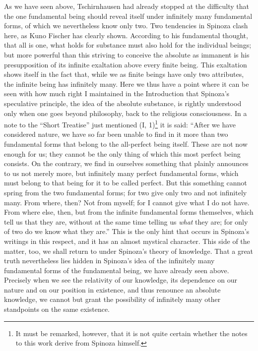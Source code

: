 \documentclass[12pt]{book}
\newcommand{\opage}[1]{\marginnote{\footnotesize\textit{[#1]}}}
\begin{document}
As we have seen above, Tschirnhausen had already stopped at the difficulty that the one
fundamental being should reveal itself under infinitely many fundamental forms, of which
we nevertheless know only two. Two tendencies in Spinoza clash here, as Kuno Fischer
has clearly shown. According to his fundamental thought, that all is one, what holds
for substance must also hold for the individual beings; but more powerful than this
striving to conceive the absolute as immanent is his presupposition of its infinite
exaltation above every finite being. This exaltation shows itself in the fact that,
while we as finite beings have only two attributes, the infinite being has infinitely
many. Here we thus have a point where it can be seen with how much right I maintained
in the Introduction that Spinoza's speculative principle, the idea of the absolute
substance, is rightly understood only when one goes beyond philosophy, back to the
religious consciousness. In a note to the ``Short Treatise'' just mentioned
\opage{81}(I, 1)\footnote{It must be remarked, however, that it is not quite certain
whether the notes to this work derive from Spinoza himself.} it is said: ``After we
have considered nature, we have so far been unable to find in it more than two
fundamental forms that belong to the all-perfect being itself. These are not now enough
for us; they cannot be the only thing of which this most perfect being consists. On the
contrary, we find in ourselves something that plainly announces to us not merely more,
but infinitely many perfect fundamental forms, which must belong to that being for it
to be called perfect. But this something cannot spring from the two fundamental forms;
for two give only two and not infinitely many. From where, then? Not from myself; for I
cannot give what I do not have. From where else, then, but from the infinite
fundamental forms themselves, which tell us that they are, without at the same time
telling us \emph{what} they are; for only of two do we know what they are.'' This is the
only hint that occurs in Spinoza's writings in this respect, and it has an almost
mystical character. This side of the matter, too, we shall return to under Spinoza's
theory of knowledge. That a great truth nevertheless lies hidden in Spinoza's idea of
the infinitely many fundamental forms of the fundamental being, we have already seen
above. Precisely when we see the relativity of our knowledge, its dependence on our
nature and on our position in existence, and thus renounce an absolute knowledge, we
cannot but grant the possibility %
of infinitely many other standpoints on the same existence.
\end{document}
